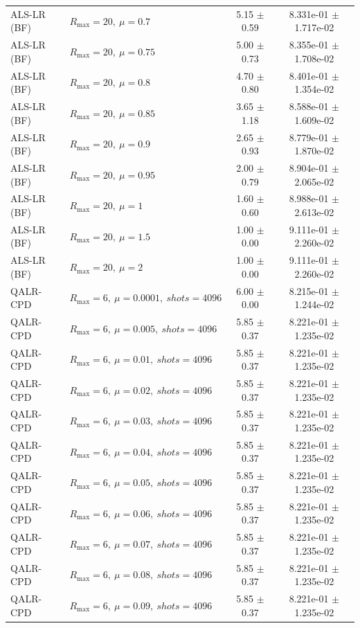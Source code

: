 \begin{table}[t]
\begin{tabular}{@{}llcc@{}}
ALS-LR (BF) & \(R_{\max}=20,\ \mu=0.7\) & 5.15 $\pm$ 0.59 & 8.331e-01 $\pm$ 1.717e-02 \\
ALS-LR (BF) & \(R_{\max}=20,\ \mu=0.75\) & 5.00 $\pm$ 0.73 & 8.355e-01 $\pm$ 1.708e-02 \\
ALS-LR (BF) & \(R_{\max}=20,\ \mu=0.8\) & 4.70 $\pm$ 0.80 & 8.401e-01 $\pm$ 1.354e-02 \\
ALS-LR (BF) & \(R_{\max}=20,\ \mu=0.85\) & 3.65 $\pm$ 1.18 & 8.588e-01 $\pm$ 1.609e-02 \\
ALS-LR (BF) & \(R_{\max}=20,\ \mu=0.9\) & 2.65 $\pm$ 0.93 & 8.779e-01 $\pm$ 1.870e-02 \\
ALS-LR (BF) & \(R_{\max}=20,\ \mu=0.95\) & 2.00 $\pm$ 0.79 & 8.904e-01 $\pm$ 2.065e-02 \\
ALS-LR (BF) & \(R_{\max}=20,\ \mu=1\) & 1.60 $\pm$ 0.60 & 8.988e-01 $\pm$ 2.613e-02 \\
ALS-LR (BF) & \(R_{\max}=20,\ \mu=1.5\) & 1.00 $\pm$ 0.00 & 9.111e-01 $\pm$ 2.260e-02 \\
ALS-LR (BF) & \(R_{\max}=20,\ \mu=2\) & 1.00 $\pm$ 0.00 & 9.111e-01 $\pm$ 2.260e-02 \\
QALR-CPD & \(R_{\max}=6,\ \mu=0.0001,\ shots=4096\) & 6.00 $\pm$ 0.00 & 8.215e-01 $\pm$ 1.244e-02 \\
QALR-CPD & \(R_{\max}=6,\ \mu=0.005,\ shots=4096\) & 5.85 $\pm$ 0.37 & 8.221e-01 $\pm$ 1.235e-02 \\
QALR-CPD & \(R_{\max}=6,\ \mu=0.01,\ shots=4096\) & 5.85 $\pm$ 0.37 & 8.221e-01 $\pm$ 1.235e-02 \\
QALR-CPD & \(R_{\max}=6,\ \mu=0.02,\ shots=4096\) & 5.85 $\pm$ 0.37 & 8.221e-01 $\pm$ 1.235e-02 \\
QALR-CPD & \(R_{\max}=6,\ \mu=0.03,\ shots=4096\) & 5.85 $\pm$ 0.37 & 8.221e-01 $\pm$ 1.235e-02 \\
QALR-CPD & \(R_{\max}=6,\ \mu=0.04,\ shots=4096\) & 5.85 $\pm$ 0.37 & 8.221e-01 $\pm$ 1.235e-02 \\
QALR-CPD & \(R_{\max}=6,\ \mu=0.05,\ shots=4096\) & 5.85 $\pm$ 0.37 & 8.221e-01 $\pm$ 1.235e-02 \\
QALR-CPD & \(R_{\max}=6,\ \mu=0.06,\ shots=4096\) & 5.85 $\pm$ 0.37 & 8.221e-01 $\pm$ 1.235e-02 \\
QALR-CPD & \(R_{\max}=6,\ \mu=0.07,\ shots=4096\) & 5.85 $\pm$ 0.37 & 8.221e-01 $\pm$ 1.235e-02 \\
QALR-CPD & \(R_{\max}=6,\ \mu=0.08,\ shots=4096\) & 5.85 $\pm$ 0.37 & 8.221e-01 $\pm$ 1.235e-02 \\
QALR-CPD & \(R_{\max}=6,\ \mu=0.09,\ shots=4096\) & 5.85 $\pm$ 0.37 & 8.221e-01 $\pm$ 1.235e-02 \\

\end{tabular}
\end{table}
